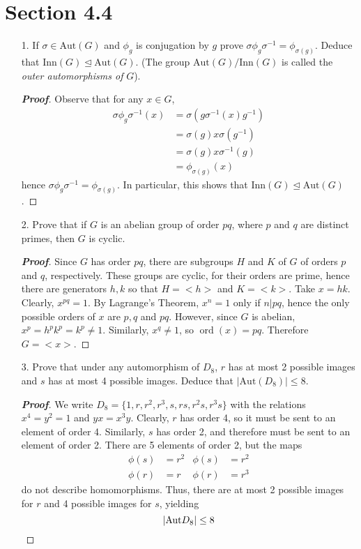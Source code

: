 \documentclass[12pt,leqno]{book}
\theoremstyle{definition}
\newcommand{\ord}{\operatorname{ord}}
\newenvironment{Proof}{\begin{proof}[\textnormal{\textbf{Proof}}]}{\end{proof}}
\begin{document}
\section*{Section 4.4}
\begin{enumerate}
 \item [1.] If $\sigma\in\text{Aut}(G)$ and $\phi_g$ is conjugation by $g$ prove $\sigma\phi_g\sigma^{-1}=\phi_{\sigma(g)}$. Deduce that $\text{Inn}(G)\unlhd\text{Aut}(G)$. (The group $\text{Aut}(G)/\text{Inn}(G)$ is called the \textit{outer automorphisms of }$G$).

\begin{Proof}
  Observe that for any $x\in G$, \begin{align*}\sigma\phi_g\sigma^{-1}(x)&=\sigma(g\sigma^{-1}(x)g^{-1})\\&=\sigma(g)x\sigma(g^{-1})\\&=\sigma(g)x\sigma^{-1}(g)\\&=\phi_{\sigma(g)}(x)\end{align*} hence $\sigma\phi_g\sigma^{-1}=\phi_{\sigma(g)}$. In particular, this shows that $\text{Inn}(G)\unlhd\text{Aut}(G)$.
\end{Proof}

 \item [2.] Prove that if $G$ is an abelian group of order $pq$, where $p$ and $q$ are distinct primes, then $G$ is cyclic.

\begin{Proof}
Since $G$ has order $pq$, there are subgroups $H$ and $K$ of $G$ of orders $p$ and $q$, respectively. These groups are cyclic, for their orders are prime, hence there are generators $h,k$ so that $H=<h>$ and $K=<k>$. Take $x=hk$. Clearly, $x^{pq}=1$. By Lagrange's Theorem, $x^n=1$ only if $n|pq$, hence the only possible orders of $x$ are $p,q$ and $pq$. However, since $G$ is abelian, $x^p=h^pk^p=k^p\not=1$. Similarly, $x^q\not=1$, so $\ord(x)=pq$. Therefore $G=<x>$. 
\end{Proof}

 \item [3.] Prove that under any automorphism of $D_8$, $r$ has at most 2 possible images and $s$ has at most 4 possible images. Deduce that $|\text{Aut}(D_8)|\leq8$. 

\begin{Proof}
 We write $D_8=\{1,r,r^2,r^3,s,rs,r^2s,r^3s\}$ with the relations $x^4=y^2=1$ and $yx=x^3y$. Clearly, $r$ has order 4, so it must be sent to an element of order 4. Similarly, $s$ has order 2, and therefore must be sent to an element of order 2. There are 5 elements of order 2, but the maps \begin{align*}\phi(s)&=r^2 & \phi(s)&=r^2\\\phi(r)&=r & \phi(r)&=r^3\end{align*} do not describe homomorphisms. Thus, there are at most 2 possible images for $r$ and 4 possible images for $s$, yielding \[\left|\text{Aut}D_8\right|\leq8\qedhere\]


\end{Proof}
\end{enumerate}
\end{document}
